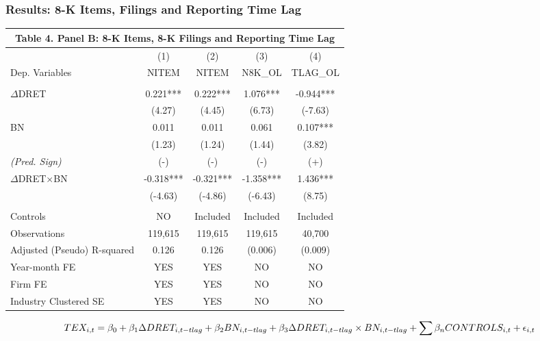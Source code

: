 \documentclass{beamer}
\begin{document}
\begin{frame}
\frametitle{Results: 8-K Items, Filings and Reporting Time Lag}
\begin{table}[H] \label{T4PB}%
	\begin{center}
	\scriptsize	
		\begin{tabular}{lcccc}
			\multicolumn{5}{c}{\textbf{Table 4. Panel B: 8-K Items, 8-K Filings and Reporting Time Lag}} \\
			\midrule
			\midrule
			& (1) & (2) & (3) & (4) \\
			Dep. Variables & NITEM & NITEM & N8K\_OL & TLAG\_OL \\
			\midrule
			&   &   &   &  \\
			$\Delta$DRET & 0.221*** & 0.222*** & 1.076*** & -0.944*** \\
			& (4.27) & (4.45) & (6.73) & (-7.63) \\
			BN & 0.011 & 0.011 & 0.061 & 0.107*** \\
			& (1.23) & (1.24) & (1.44) & (3.82) \\
			\textit{(Pred. Sign)} & (-) & (-) & (-) & (+) \\
			 $\Delta$DRET$\times$BN & -0.318*** & -0.321*** & -1.358*** & 1.436*** \\
			 & (-4.63) & (-4.86) & (-6.43) & (8.75) \\

			&   &   &   &  \\
			Controls & NO & Included & Included & Included \\
			Observations & 119,615 & 119,615 & 119,615 & 40,700 \\
			Adjusted (Pseudo) R-squared & 0.126 & 0.126  & (0.006) & (0.009) \\
			Year-month FE & YES & YES & NO & NO \\
			Firm FE & YES & YES & NO & NO \\
			Industry Clustered SE & YES & YES & NO & NO \\
			\bottomrule
			\bottomrule
		\end{tabular}%
	\end{center}
	\begin{footnotesize}
			
		\setcounter{equation}{1}
		\begin{equation} \tiny	
		TEX_{i,t}=\beta_0+\beta_1\Delta DRET_{i,t-tlag}+\beta_2BN_{i,t-tlag}+\beta_3\Delta DRET_{i,t-tlag}\times 	BN_{i,t-tlag}+\sum\beta_nCONTROLS_{i,t}+\epsilon_{i,t}
		\end{equation}

	\end{footnotesize}
\end{table}
\end{frame}
\end{document}
